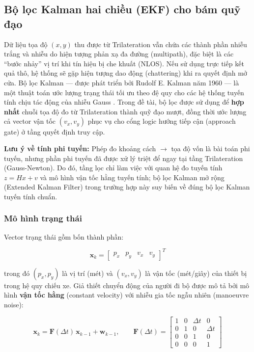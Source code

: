 \subsection{Bộ lọc Kalman hai chiều (EKF) cho bám quỹ đạo}

Dữ liệu tọa độ $(x, y)$ thu được từ Trilateration vẫn chứa các thành phần nhiễu trắng và nhiễu do hiện tượng phản xạ đa đường (multipath), đặc biệt là các ``bước nhảy'' vị trí khi tín hiệu bị che khuất (NLOS). Nếu sử dụng trực tiếp kết quả thô, hệ thống sẽ gặp hiện tượng dao động (chattering) khi ra quyết định mở cửa. Bộ lọc Kalman --- được phát triển bởi Rudolf E. Kalman năm 1960 \cite{kalman1960} --- là một thuật toán ước lượng trạng thái tối ưu theo đệ quy cho các hệ thống tuyến tính chịu tác động của nhiễu Gauss \cite{welch2001kalman}. Trong đề tài, bộ lọc được sử dụng để \textbf{hợp nhất} chuỗi tọa độ đo từ Trilateration thành quỹ đạo mượt, đồng thời ước lượng cả vector vận tốc $(v_x, v_y)$ phục vụ cho cổng logic hướng tiếp cận (approach gate) ở tầng quyết định truy cập.

\textbf{Lưu ý về tính phi tuyến:} Phép đo khoảng cách $\rightarrow$ tọa độ vốn là bài toán phi tuyến, nhưng phần phi tuyến đã được xử lý triệt để ngay tại tầng Trilateration (Gauss-Newton). Do đó, tầng lọc chỉ làm việc với quan hệ đo tuyến tính $z = Hx + v$ và mô hình vận tốc hằng tuyến tính; bộ lọc Kalman mở rộng (Extended Kalman Filter) trong trường hợp này suy biến về đúng bộ lọc Kalman tuyến tính chuẩn.

\subsubsection{Mô hình trạng thái}

Vector trạng thái gồm bốn thành phần:

\begin{equation}
    \mathbf{x}_k = \begin{bmatrix} p_x & p_y & v_x & v_y \end{bmatrix}^T
\end{equation}

trong đó $(p_x, p_y)$ là vị trí (mét) và $(v_x, v_y)$ là vận tốc (mét/giây) của thiết bị trong hệ quy chiếu xe. Giả thiết chuyển động của người đi bộ được mô tả bởi mô hình \textbf{vận tốc hằng} (constant velocity) với nhiễu gia tốc ngẫu nhiên (manoeuvre noise):

\begin{equation}
    \mathbf{x}_{k} = \mathbf{F}(\Delta t)\, \mathbf{x}_{k-1} + \mathbf{w}_{k-1}, \qquad
    \mathbf{F}(\Delta t) =
    \begin{bmatrix}
        1 & 0 & \Delta t & 0 \\
        0 & 1 & 0 & \Delta t \\
        0 & 0 & 1 & 0 \\
        0 & 0 & 0 & 1
    \end{bmatrix}
\end{equation}

